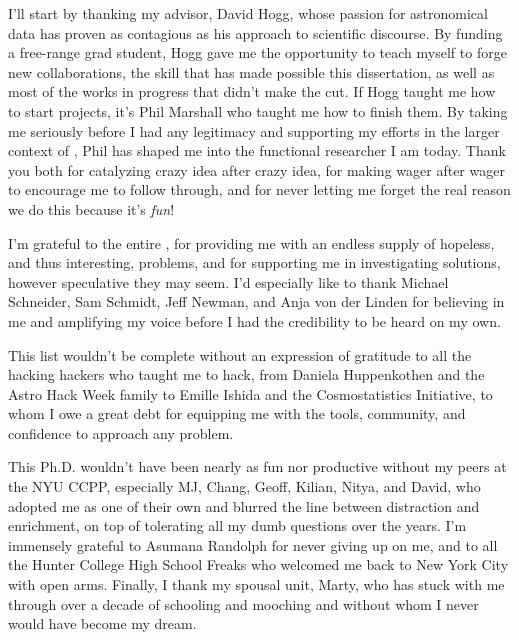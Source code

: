 I'll start by thanking my advisor, David Hogg, whose passion for astronomical data has proven as contagious as his approach to scientific discourse.
By funding a free-range grad student, Hogg gave me the opportunity to teach myself to forge new collaborations, the skill that has made possible this dissertation, as well as most of the works in progress that didn't make the cut.
If Hogg taught me how to start projects, it's Phil Marshall who taught me how to finish them.
By taking me seriously before I had any legitimacy and supporting my efforts in the larger context of \desc, Phil has shaped me into the functional researcher I am today.
Thank you both for catalyzing crazy idea after crazy idea, for making wager after wager to encourage me to follow through, and for never letting me forget the real reason we do this \textemdash because it's \textit{fun}!

I'm grateful to the entire \desc, for providing me with an endless supply of hopeless, and thus interesting, problems, and for supporting me in investigating solutions, however speculative they may seem. 
I'd especially like to thank Michael Schneider, Sam Schmidt, Jeff Newman, and Anja von der Linden for believing in me and amplifying my voice before I had the credibility to be heard on my own.

This list wouldn't be complete without an expression of gratitude to all the hacking hackers who taught me to hack, from Daniela Huppenkothen and the Astro Hack Week family to Emille Ishida and the Cosmostatistics Initiative, to whom I owe a great debt for equipping me with the tools, community, and confidence to approach any problem.


This Ph.D. wouldn't have been nearly as fun nor productive without my peers at the NYU CCPP, especially MJ, Chang, Geoff, Kilian, Nitya, and David, who adopted me as one of their own and blurred the line between distraction and enrichment, on top of tolerating all my dumb questions over the years.
I'm immensely grateful to Asumana Randolph for never giving up on me, and to all the Hunter College High School Freaks who welcomed me back to New York City with open arms.
Finally, I thank my spousal unit, Marty, who has stuck with me through over a decade of schooling and mooching and without whom I never would have become my dream.